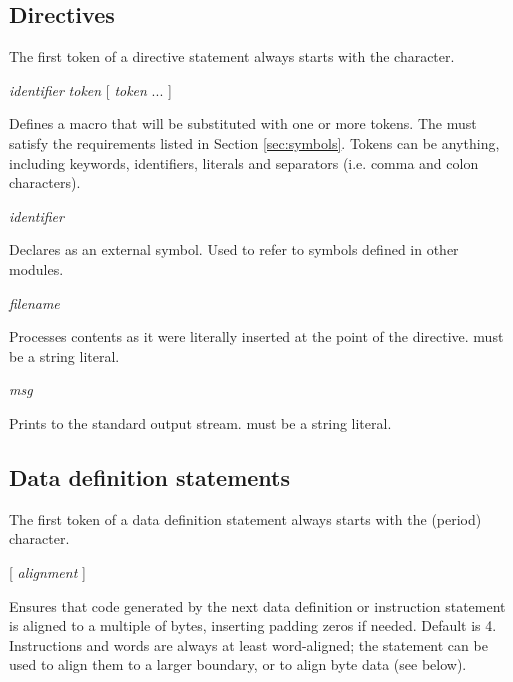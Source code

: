 \documentclass[a4paper,12pt,twoside,extrafontsizes]{memoir}
\begin{document}
\subsection{Directives}

The first token of a directive statement always starts with the \code{\#} character.

\begin{codepar}
 \emph{identifier} \emph{token} [ \emph{token} ... ]
\end{codepar}

Defines a macro that will be substituted with one or more tokens. The  must satisfy the requirements listed in Section \ref{sec:symbols}. Tokens can be anything, including keywords, identifiers, literals and separators (i.e. comma and colon characters).

\begin{codepar}
 \emph{identifier}
\end{codepar}

Declares  as an external symbol. Used to refer to symbols defined in other modules.

\begin{codepar}
 \emph{filename}
\end{codepar}

Processes  contents as it were literally inserted at the point of the  directive.  must be a string literal.

\begin{codepar}
 \emph{msg}
\end{codepar}

Prints  to the standard output stream.  must be a string literal.

\subsection{Data definition statements}

The first token of a data definition statement always starts with the  (period) character.

\begin{codepar}
 [ \emph{alignment} ]
\end{codepar}

Ensures that code generated by the next data definition or instruction statement is aligned to a multiple of  bytes, inserting padding zeros if needed. Default  is 4. Instructions and words are always at least word-aligned; the  statement can be used to align them to a larger boundary, or to align byte data (see below).
\end{document}
